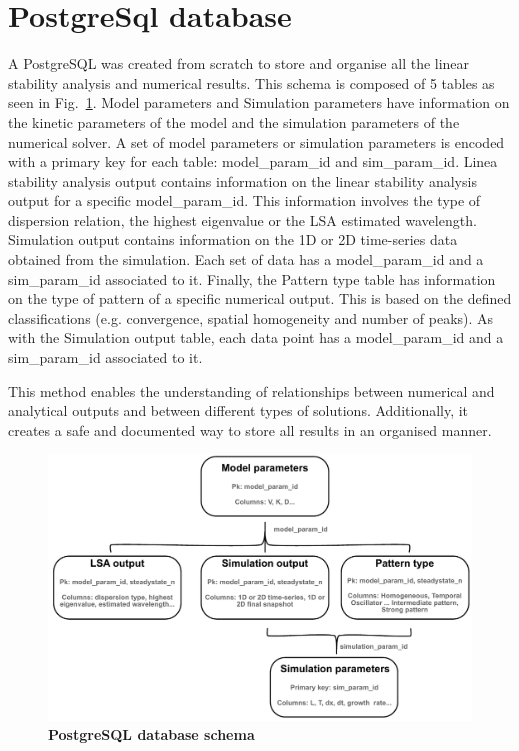 \section{PostgreSql database}\label{PostgreSql database}
A PostgreSQL was created from scratch to store and organise all the linear stability analysis and numerical results.
This schema is composed of 5 tables as seen in Fig.~\ref{psql_schema}.
Model parameters and Simulation parameters have information on the kinetic parameters of the model and the simulation parameters of the numerical solver.
A set of model parameters or simulation parameters is encoded with a primary key for each table: model\_param\_id and sim\_param\_id.
Linea stability analysis output contains information on the linear stability analysis output for a specific model\_param\_id.
This information involves the type of dispersion relation, the highest eigenvalue or the LSA estimated wavelength.
Simulation output contains information on the \acrfull{1D} or \acrfull{2D} time-series data obtained from the simulation. Each set of data has a model\_param\_id and a sim\_param\_id associated to it.
Finally, the Pattern type table has information on the type of pattern of a specific numerical output.
This is based on the defined classifications (e.g. convergence, spatial homogeneity and number of peaks).
As with the Simulation output table, each data point has a model\_param\_id and a sim\_param\_id associated to it.

This method enables the understanding of relationships between numerical and analytical outputs and between different types of solutions.
Additionally, it creates a safe and documented way to store all results in an organised manner.

\begin{figure}[H]

    \includegraphics[width=1\textwidth]{chapters/Methods/psql_schema}
    \caption{\textbf{PostgreSQL database schema}}
    \label{psql_schema}
\end{figure}

